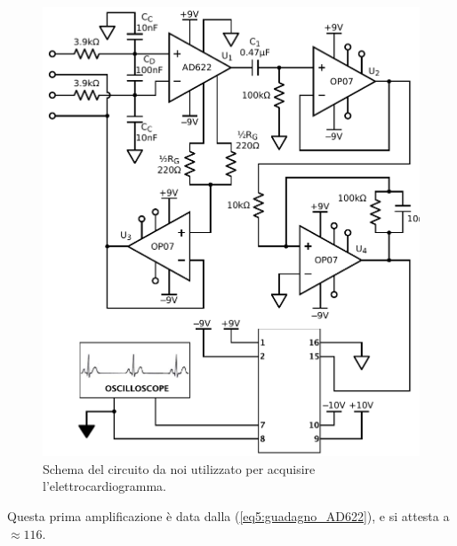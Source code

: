 \begin{figure}[tpc]
\centering
\includegraphics[width=.7\textwidth]{../E07/latex/circuito.pdf}
\caption{Schema del circuito da noi utilizzato per acquisire l'elettrocardiogramma.}
\label{cir8:compensation}
\end{figure}

Questa prima amplificazione è data dalla (\ref{eq5:guadagno_AD622}), e si attesta a $\approx 116$.